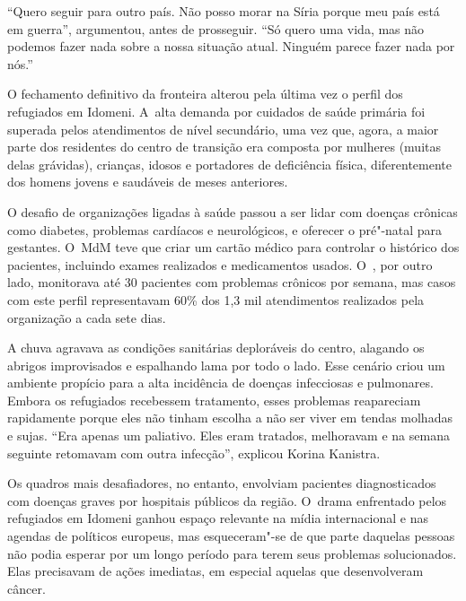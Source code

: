 ``Quero seguir para outro país. Não posso morar na Síria porque meu país
está em guerra'', argumentou, antes de prosseguir. ``Só quero uma vida, mas não
podemos fazer nada sobre a nossa situação atual. Ninguém parece fazer
nada por nós.''

O fechamento definitivo da fronteira alterou pela última vez o perfil
dos refugiados em Idomeni. A~alta demanda por cuidados de saúde primária
foi superada pelos atendimentos de nível secundário, uma vez que, agora, a maior
parte dos residentes do centro de transição era composta por
mulheres (muitas delas grávidas), crianças, idosos e portadores
de deficiência física, diferentemente dos homens jovens e saudáveis de
meses anteriores.

O desafio de organizações ligadas à saúde passou a ser lidar com doenças
% 
% 
%
%
crônicas como diabetes, problemas cardíacos e neurológicos, e oferecer o
pré"-natal para gestantes. O~MdM teve que criar um cartão médico para
controlar o histórico dos pacientes, incluindo exames realizados e
medicamentos usados. O~, por outro lado, monitorava até 30 pacientes
com problemas crônicos por semana, mas casos com este perfil
representavam 60\% dos 1,3 mil atendimentos realizados pela organização
a cada sete dias.

A chuva agravava as condições sanitárias deploráveis do centro, alagando
os abrigos improvisados e espalhando lama por todo o lado. Esse cenário
criou um ambiente propício para a alta incidência de doenças infecciosas
e pulmonares. Embora os refugiados recebessem tratamento, esses
problemas reapareciam rapidamente porque eles não tinham escolha a não
ser viver em tendas molhadas e sujas. ``Era apenas um paliativo. Eles
eram tratados, melhoravam e na semana seguinte retomavam com outra
infecção'', explicou Korina Kanistra.

Os quadros mais desafiadores, no entanto, envolviam pacientes
diagnosticados com doenças graves por hospitais públicos da região. O~drama enfrentado pelos refugiados em Idomeni ganhou espaço relevante na
mídia internacional e nas agendas de políticos europeus, mas esqueceram"-se
de que parte daquelas pessoas não podia esperar por um longo período
para terem seus problemas solucionados. Elas precisavam de ações
imediatas, em especial aquelas que desenvolveram câncer.

